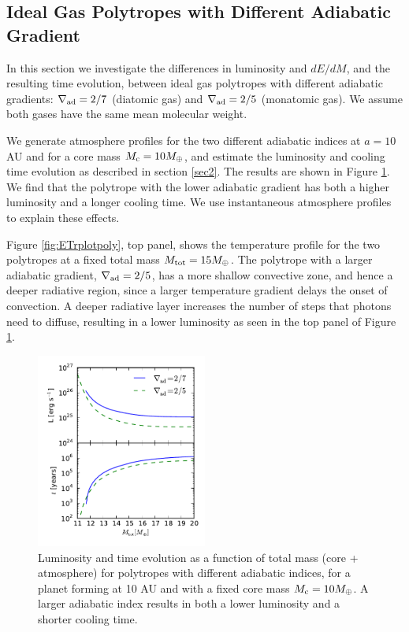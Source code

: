 \documentclass[apj]{emulateapj}
\newcommand{\delad}{\nabla_{\rm ad}}
\begin{document}
\subsection{Ideal Gas Polytropes with Different Adiabatic Gradient}
\label{deladpoly}

In this section we investigate the differences in luminosity and $dE/dM$, and the resulting time evolution, between ideal gas polytropes with different adiabatic gradients: $\delad=2/7$ (diatomic gas) and $\delad=2/5$ (monatomic gas). We assume both gases have the same mean molecular weight. %

We generate atmosphere profiles for the two different adiabatic indices at $a=10$ AU and for a core mass $M_{\rm c}=10 M_{\oplus}$, and estimate the luminosity and cooling time evolution as described in section \ref{sec2}. The results are shown in Figure \ref{fig:Ltplotpoly}. We find that the polytrope with the lower adiabatic gradient has both a higher luminosity and a longer cooling time. We use instantaneous atmosphere profiles to explain these effects. 


Figure \ref{fig:ETrplotpoly}, top panel, shows the temperature profile for the two polytropes at a fixed total mass $M_{\rm{tot}}=15 M_{\oplus}$. The polytrope with a larger adiabatic gradient, $\delad=2/5$, has a more shallow convective zone, and hence a deeper radiative region, since a larger temperature gradient delays the onset of convection. A deeper radiative layer increases the number of steps that photons need to diffuse, resulting in a lower luminosity as seen in the top panel of Figure \ref{fig:Ltplotpoly}. 

\begin{figure}[h]
\centering
\includegraphics[width=0.5\textwidth]{../../figs/ModelAtmospheres/RadSelfGravRealEOS/PaperFigs/Ltplot_poly.pdf}
\caption{Luminosity and time evolution as a function of total mass (core + atmosphere) for polytropes with different adiabatic indices, for a planet forming at 10 AU and with a fixed core mass $M_{\rm c}=10 M_{\oplus}$. A larger adiabatic index results in both a lower luminosity and a shorter cooling time.}
\label{fig:Ltplotpoly}
\end{figure}
\end{document}

